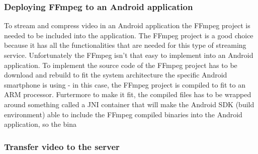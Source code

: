 \subsubsection{Deploying FFmpeg to an Android application}
To stream and compress video in an Android application the FFmpeg project is needed to be included into the application. The FFmpeg project is a good choice because it has all the functionalities that are needed for this type of streaming service. Unfortunately the FFmpeg isn't that easy to implement into an Android application. To implement the source code of the FFmpeg project has to be download and rebuild to fit the system architecture the specific Android smartphone is using - in this case, the FFmpeg project is compiled to fit to an ARM processor. Furtermore to make it fit, the compiled files has to be wrapped around something called a JNI container that will make the Android SDK (build environment) able to include the FFmpeg compiled binaries into the Android application, so the bina

\subsubsection{Transfer video to the server}
